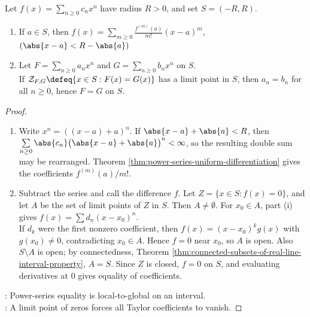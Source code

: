\begin{theorem} \label{thm:power-series-reexpansion-and-identity} \\
Let $f(x)=\sum_{n\ge0}c_nx^n$ have radius $R>0$, and set $S=(-R,R)$.
\begin{enumerate}[label=(\roman*)]
\setlength{\itemsep}{0pt}
\item If $a\in S$, then $f(x)=\sum\limits_{m\ge0}\frac{f^{(m)}(a)}{m!}(x-a)^m$, $(\abs{x-a}<R-\abs{a})$
\item Let $F=\sum\limits_{n\ge0}a_nx^n$ and $G=\sum\limits_{n\ge0}b_nx^n$ on $S$.\\
If $\mathcal{Z}_{F,G}\defeq\{x\in S:F(x)=G(x)\}$ has a limit point in $S$, then $a_n=b_n$ for all $n\ge0$, hence $F=G$ on $S$.
\end{enumerate}
\begin{proof}
\begin{enumerate}[label=(\roman*)]
\setlength{\itemsep}{0pt}
\item Write $x^n=((x-a)+a)^n$. If $\abs{x-a}+\abs{a}<R$, then $\sum\limits_{n\ge0}\abs{c_n}\bigl(\abs{x-a}+\abs{a}\bigr)^n<\infty$, so the resulting double sum may be rearranged. Theorem \ref{thm:power-series-uniform-differentiation} gives the coefficients $f^{(m)}(a)/m!$.
\item Subtract the series and call the difference $f$. Let $Z=\{x\in S:f(x)=0\}$, and let $A$ be the set of limit points of $Z$ in $S$. Then $A\neq\emptyset$. For $x_0\in A$, part (i) gives $f(x)=\sum d_n(x-x_0)^n$.\\
If $d_k$ were the first nonzero coefficient, then $f(x)=(x-x_0)^kg(x)$ with $g(x_0)\neq0$, contradicting $x_0\in A$. Hence $f=0$ near $x_0$, so $A$ is open. Also $S\setminus A$ is open; by connectedness, Theorem \ref{thm:connected-subsets-of-real-line-interval-property}, $A=S$. Since $Z$ is closed, $f=0$ on $S$, and evaluating derivatives at $0$ gives equality of coefficients.
\end{enumerate}
: Power-series equality is local-to-global on an interval.\\
: A limit point of zeros forces all Taylor coefficients to vanish.
\end{proof}
\end{theorem}
